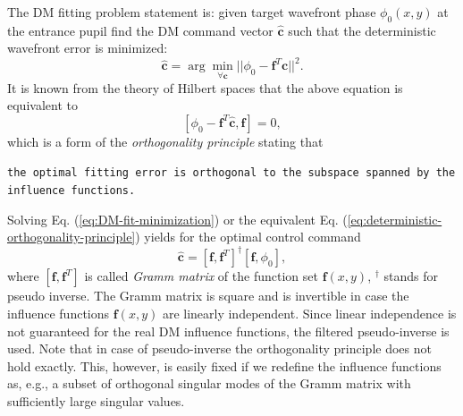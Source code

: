 The DM fitting problem statement is:
given target wavefront phase $\phi_{0}(x,y)$ at the entrance pupil find the
DM command vector $\hat{\bm{c}}$ such that the deterministic wavefront error
is minimized:
\begin{equation} \label{eq:DM-fit-minimization}
	\hat{\bm{c}} = \arg \min_{\forall \bm{c}}
	||\phi_{0} - \bm{f}^{T} \bm{c}||^{2}.
\end{equation}
It is known from the theory of Hilbert spaces that the above equation is
equivalent to
\begin{equation} \label{eq:deterministic-orthogonality-principle}
	[\phi_{0} - \bm{f}^{T} \hat{\bm{c}}, \bm{f}] = 0,
\end{equation}
which is a form of the \emph{orthogonality principle} stating that
\begin{flushleft}
	\texttt{the optimal fitting error is orthogonal to the subspace spanned by the
	influence functions.}
\end{flushleft}
Solving Eq. (\ref{eq:DM-fit-minimization}) or the equivalent Eq.
(\ref{eq:deterministic-orthogonality-principle}) yields for the optimal
control command
\begin{equation} \label{eq:fitting-commands}
	\hat{\bm{c}} = [\bm{f},\bm{f}^{T}]^{\dagger} [\bm{f},\phi_{0}],
\end{equation}
where $[\bm{f},\bm{f}^{T}]$ is called \emph{Gramm matrix} of the function set
$\bm{f}(x,y)$, $^{\dagger}$ stands for pseudo inverse. The Gramm matrix is
square and is invertible in case the influence functions $\bm{f} (x,y)$ are
linearly independent. Since linear independence is not guaranteed for the real
DM influence functions, the filtered pseudo-inverse is used. Note that in case
of pseudo-inverse the orthogonality principle does not hold exactly. This,
however, is easily fixed if we redefine the influence functions as, e.g., a
subset of orthogonal singular modes of the Gramm matrix with sufficiently large
singular values.

